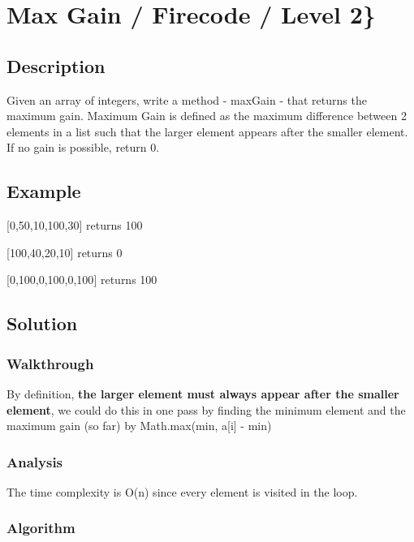 \documentclass[]{book}
\begin{document}
\hypertarget{max-gain-firecode-level-2}{%
\section{Max Gain / Firecode / Level 2\}}\label{max-gain-firecode-level-2}}

\hypertarget{description-8}{%
\subsection{Description}\label{description-8}}

Given an array of integers, write a method - maxGain - that returns the maximum gain. Maximum Gain is defined as the
maximum difference between 2 elements in a list such that the larger element appears after the smaller element. If no
gain is possible, return 0.

\hypertarget{example-7}{%
\subsection{Example}\label{example-7}}

{[}0,50,10,100,30{]} returns 100

{[}100,40,20,10{]} returns 0

{[}0,100,0,100,0,100{]} returns 100

\hypertarget{solution-6}{%
\subsection{Solution}\label{solution-6}}

\hypertarget{walkthrough-8}{%
\subsubsection{Walkthrough}\label{walkthrough-8}}

By definition, \textbf{the larger element must always appear after the smaller element}, we could do this in one pass
by finding the minimum element and the maximum gain (so far) by Math.max(min, a{[}i{]} - min)

\hypertarget{analysis-9}{%
\subsubsection{Analysis}\label{analysis-9}}

The time complexity is O(n) since every element is visited in the loop.

\hypertarget{algorithm-9}{%
\subsubsection{Algorithm}\label{algorithm-9}}
\end{document}
